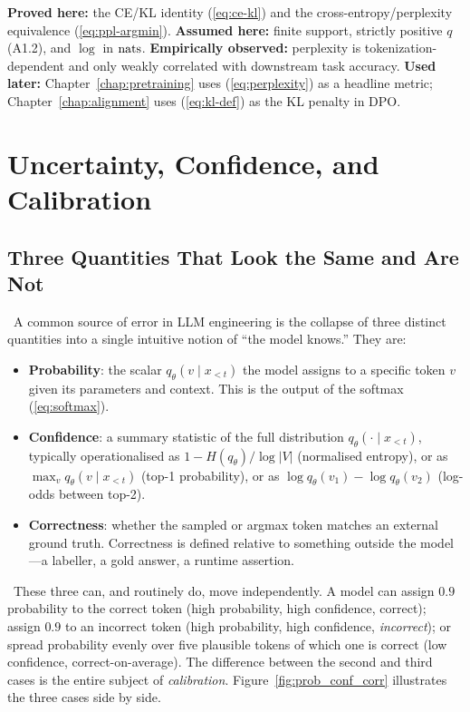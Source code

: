 \begin{provedassumed}
\textbf{Proved here:} the CE/KL identity (\ref{eq:ce-kl}) and the
cross-entropy/perplexity equivalence (\ref{eq:ppl-argmin}).
\textbf{Assumed here:} finite support, strictly positive $q$ (A1.2),
and $\log$ in $\mathrm{nats}$.
\textbf{Empirically observed:} perplexity is tokenization-dependent and
only weakly correlated with downstream task accuracy.
\textbf{Used later:} Chapter~\ref{chap:pretraining} uses (\ref{eq:perplexity}) as a headline
metric; Chapter~\ref{chap:alignment} uses (\ref{eq:kl-def}) as the KL penalty in DPO.
\end{provedassumed}

\section{Uncertainty, Confidence, and Calibration}

\subsection{Three Quantities That Look the Same and Are Not}

\Def\ A common source of error in LLM engineering is the collapse of
three distinct quantities into a single intuitive notion of ``the model
knows.'' They are:
\begin{itemize}
  \item \textbf{Probability}: the scalar $q_\theta(v \mid x_{<t})$ the
  model assigns to a specific token $v$ given its parameters and
  context. This is the output of the softmax (\ref{eq:softmax}).
  \item \textbf{Confidence}: a summary statistic of the full
  distribution $q_\theta(\cdot \mid x_{<t})$, typically operationalised
  as $1 - H(q_\theta) / \log |V|$ (normalised entropy), or as $\max_v
  q_\theta(v \mid x_{<t})$ (top-1 probability), or as $\log q_\theta(v_1)
  - \log q_\theta(v_2)$ (log-odds between top-2).
  \item \textbf{Correctness}: whether the sampled or argmax token
  matches an external ground truth. Correctness is defined relative to
  something outside the model---a labeller, a gold answer, a runtime
  assertion.
\end{itemize}

\Emp\ These three can, and routinely do, move independently. A model
can assign $0.9$ probability to the correct token (high probability,
high confidence, correct); assign $0.9$ to an incorrect token (high
probability, high confidence, \emph{incorrect}); or spread probability
evenly over five plausible tokens of which one is correct (low
confidence, correct-on-average). The difference between the second and
third cases is the entire subject of \emph{calibration}.
Figure~\ref{fig:prob_conf_corr} illustrates the three cases side by
side.

